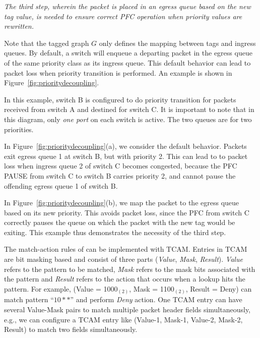 {\em The third step, wherein the packet is placed in an egress queue based on the
{\em new} tag value, is needed to ensure correct PFC operation when priority
values are rewritten.}

Note that the tagged graph $G$ only defines the mapping between tags and ingress
queues. By default, a switch will enqueue a departing packet in the egress queue
of the same priority class as its ingress queue. This default behavior can lead
to packet loss when priority transition is performed. An example is shown in
Figure~\ref{fig:prioritydecoupling}. 
 
In this example, switch B is configured to do priority transition for packets
received from switch A and destined for switch C. It is important to note that
in this diagram, only {\em one port} on each switch is active. The two queues
are for two priorities.
 
In Figure~\ref{fig:prioritydecoupling}(a), we consider the default behavior.
Packets exit egress queue 1 at switch B, but with priority 2.  This can lead to
to packet loss when ingress queue 2 of switch C becomes congested, because 
the PFC PAUSE from switch C to switch B carries priority 2, and cannot pause 
the offending egress queue 1 of switch B. 
 
In Figure~\ref{fig:prioritydecoupling}(b), we map the packet to the egress queue
based on its new priority.  This avoids packet loss, since the PFC from switch C
correctly pauses the queue on which the packet with the new tag would be
exiting. This example thus demonstrates the necessity of the third step.

  The match-action rules of \sysname{} can be implemented with TCAM. Entries in TCAM are bit masking based and consist of three parts ({\em Value}, {\em Mask}, {\em Result}). {\em Value} refers to the pattern to be matched, {\em Mask} refers to the mask bits associated with the pattern and {\em Result} refers to the action that occurs when a lookup hits the pattern. For example, (Value = 1000$_{(2)}$, Mask = 1100$_{(2)}$, Result = Deny) can match pattern ``$10**$'' and perform {\em Deny} action. One TCAM entry can have several Value-Mask pairs to match multiple packet header fields simultaneously, e.g., we can configure a TCAM entry like (Value-1, Mask-1, Value-2, Mask-2, Result) to match two fields simultaneously.

